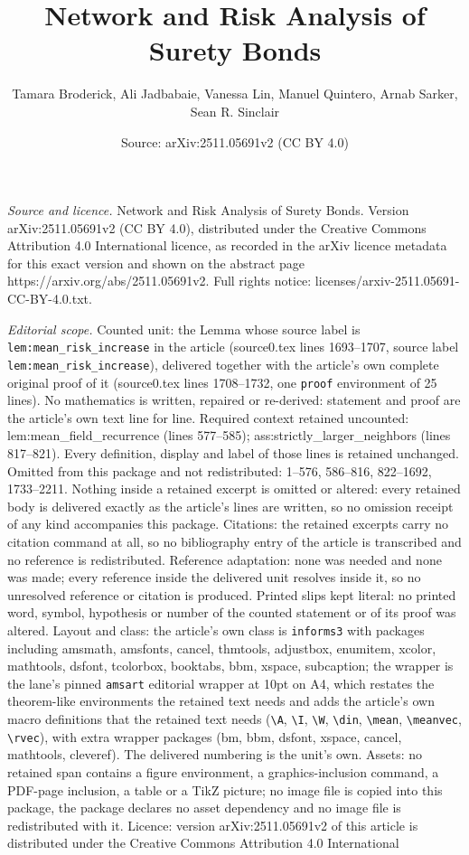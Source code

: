 \documentclass[10pt,a4paper]{amsart}
\title[Network and Risk Analysis of Surety Bonds]{Network and Risk Analysis of Surety Bonds}
\author{Tamara Broderick, Ali Jadbabaie, Vanessa Lin, Manuel Quintero, Arnab Sarker, Sean R. Sinclair}
\date{Source: arXiv:2511.05691v2 (CC BY 4.0)}
\begin{document}
\maketitle

\noindent\emph{Source and licence.} Network and Risk Analysis of Surety Bonds. Version arXiv:2511.05691v2 (CC BY 4.0), distributed under the Creative Commons Attribution 4.0 International licence, as recorded in the arXiv licence metadata for this exact version and shown on the abstract page https://arxiv.org/abs/2511.05691v2. Full rights notice: licenses/arxiv-2511.05691-CC-BY-4.0.txt.\par\smallskip

\noindent\textit{Editorial scope.} Counted unit: the Lemma whose source label is \texttt{lem:mean\_risk\_increase} in the article (source0.tex lines 1693--1707, source label \texttt{lem:mean\_risk\_increase}), delivered together with the article's own complete original proof of it (source0.tex lines 1708--1732, one \texttt{proof} environment of 25 lines). No mathematics is written, repaired or re-derived: statement and proof are the article's own text line for line. Required context retained uncounted: lem:mean\_field\_recurrence (lines 577--585); ass:strictly\_larger\_neighbors (lines 817--821). Every definition, display and label of those lines is retained unchanged. Omitted from this package and not redistributed: 1--576, 586--816, 822--1692, 1733--2211. Nothing inside a retained excerpt is omitted or altered: every retained body is delivered exactly as the article's lines are written, so no omission receipt of any kind accompanies this package. Citations: the retained excerpts carry no citation command at all, so no bibliography entry of the article is transcribed and no reference is redistributed. Reference adaptation: none was needed and none was made; every reference inside the delivered unit resolves inside it, so no unresolved reference or citation is produced. Printed slips kept literal: no printed word, symbol, hypothesis or number of the counted statement or of its proof was altered. Layout and class: the article's own class is \texttt{informs3} with packages including amsmath, amsfonts, cancel, thmtools, adjustbox, enumitem, xcolor, mathtools, dsfont, tcolorbox, booktabs, bbm, xspace, subcaption; the wrapper is the lane's pinned \texttt{amsart} editorial wrapper at 10pt on A4, which restates the theorem-like environments the retained text needs and adds the article's own macro definitions that the retained text needs (\texttt{\textbackslash A}, \texttt{\textbackslash I}, \texttt{\textbackslash W}, \texttt{\textbackslash din}, \texttt{\textbackslash mean}, \texttt{\textbackslash meanvec}, \texttt{\textbackslash rvec}), with extra wrapper packages (bm, bbm, dsfont, xspace, cancel, mathtools, cleveref). The delivered numbering is the unit's own. Assets: no retained span contains a figure environment, a graphics-inclusion command, a PDF-page inclusion, a table or a TikZ picture; no image file is copied into this package, the package declares no asset dependency and no image file is redistributed with it. Licence: version arXiv:2511.05691v2 of this article is distributed under the Creative Commons Attribution 4.0 International 
\end{document}
